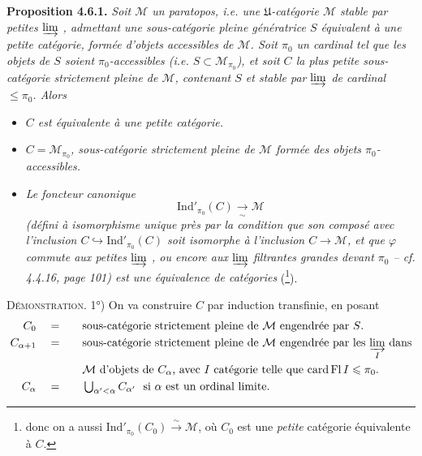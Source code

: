 \documentclass[11pt]{article}
\newcommand{\msp}[1]{\marginpar{\footnotesize [#1]}}
\newcommand{\Ind}{\mathrm{Ind}}
\begin{document}
\textbf{Proposition 4.6.1.} \textit{Soit $\mathcal{M}$ un paratopos, i.e. une $\mathfrak{U}$-catégorie $\mathcal{M}$ stable par petites $\varinjlim$ , admettant une sous-catégorie pleine génératrice $S$ équivalent à une petite catégorie, formée d'objets accessibles de $\mathcal{M}$. Soit $\pi_0$ un cardinal tel que les objets de $S$ soient $\pi_0$-accessibles (i.e. $S\subset\mathcal{M}_{\pi_0}$), et soit $C$ la plus petite sous-catégorie strictement pleine de $\mathcal{M}$, contenant $S$ et stable par $\varinjlim$ de cardinal $\leqslant\pi_0$. Alors} %
\begin{itemize}[leftmargin=2.5em]
\item[\textit{1°)}] \textit{$C$ est équivalente à une petite catégorie.}

\msp{page 140}

\item[\textit{2°)}] \textit{$C=\mathcal{M}_{\pi_0}$, sous-catégorie strictement pleine de $\mathcal{M}$ formée des objets $\pi_0$-accessibles.}
\item[\textit{3°)}] \textit{Le foncteur canonique}
\[
\Ind'_{\pi_0}(C) \xrightarrow[\sim]{} \mathcal{M} %
\]
\textit{(défini à isomorphisme unique près par la condition que son composé avec l'inclusion $C\hookrightarrow\Ind'_{\pi_0}(C)$ soit isomorphe à l'inclusion $C\longrightarrow\mathcal{M}$, et que $\varphi$ commute aux petites $\varinjlim$ , ou encore aux $\varinjlim$ filtrantes grandes devant $\pi_0$ – cf. 4.4.16, page 101) est une équivalence de catégories} (\footnote[54]{donc on a aussi $\Ind'_{\pi_0}(C_0)\xrightarrow{\ \sim\ }\mathcal{M}$, où $C_0$ est une \textit{petite} catégorie équivalente à $C$.}).
\end{itemize}

\textsc{Démonstration}. 1°) On va construire $C$ par induction transfinie, en posant
\[
\begin{aligned}
C_0 &\quad=\quad && \text{sous-catégorie strictement pleine de $\mathcal{M}$ engendrée par $S$.}\\
C_{\alpha+1} &\quad=\quad && \text{sous-catégorie strictement pleine de $\mathcal{M}$ engendrée par les $\varinjlim\limits_{I}$ dans}\\
& && \text{$\mathcal{M}$ d'objets de $C_\alpha$, avec $I$ catégorie telle que $\operatorname{card}\operatorname{Fl}I\leqslant\pi_0$.}\\
C_\alpha &\quad=\quad && \textstyle\bigcup_{\alpha'<\alpha}C_{\alpha'}\ \text{ si $\alpha$ est un ordinal limite.}
\end{aligned}
\]
\end{document}
